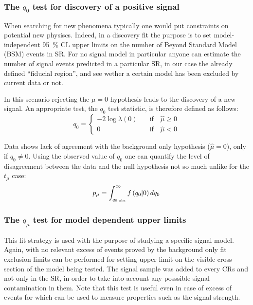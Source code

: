 \subsubsection{The $q_0$ test for discovery of a positive signal}
When searching for new phenomena typically one would put constraints on potential new physiscs. Indeed, in a discovery fit the purpose is to set model-independent \SI{95}{\percent} CL upper limits on the number of Beyond Standard Model (BSM) events in SR. For no signal model in particular anyone can estimate the number of signal events predicted in a particular SR, in our case the already defined ``fiducial region'', and see wether a certain model has been excluded by current data or not.

In this scenario rejecting the $\mu = 0$ hypothesis leads to the discovery of a new signal.  An appropriate test, the $q_0$ test statistic, is therefore defined as follows:
\begin{equation}
q_0=
\left\{
\begin{aligned}
-2\log{\lambda(0)}\quad &\text{if}\quad \hat{\mu}\ge0\\
 0 \qquad&\text{if}\quad \hat{\mu}<0
\end{aligned}
\right.
\end{equation} 

Data shows lack of agreement with the background only hypothesis ($\hat{\mu}=0$), only if $q_0\ne0$. Using the observed value of $q_0$ one can quantify the level of disagreement between the data and the null hypothesis not so much unlike for the $t_\mu$ case:
\begin{equation}
 p_{\mu}=\int_{q_{0,\textup{obs}}}^\infty f\left(q_0 \vert 0\right) dq_0
 \label{eqn:pdaq0}
\end{equation}

\subsubsection{The $q_\mu$ test for model dependent upper limits}
This fit strategy is used with the purpose of studying a specific signal model. Again, with no relevant excess of events proved by the background only fit exclusion limits can be performed for setting upper limit on the visible cross section of the model being tested. The signal sample was added to every CRs and not only in the SR, in order to take into account any posssible signal contamination in them. Note that this test is useful even in case of excess of events for which can be used to measure properties such as the signal strength.

